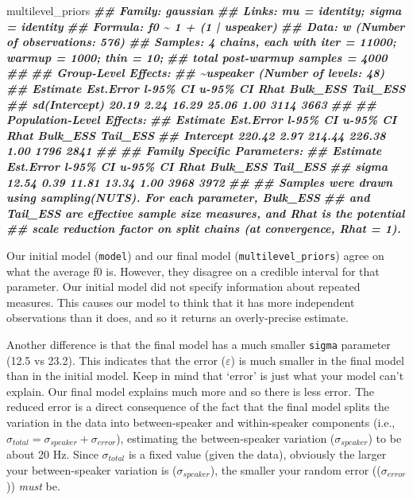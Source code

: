 \documentclass[
]{book}
\newenvironment{Shaded}{\begin{snugshade}}{\end{snugshade}}
\newcommand{\DocumentationTok}[1]{\textcolor[rgb]{0.56,0.35,0.01}{\textbf{\textit{#1}}}}
\newcommand{\NormalTok}[1]{#1}
\begin{document}
\begin{Shaded}
\begin{Highlighting}[]
\NormalTok{multilevel\_priors}
\DocumentationTok{\#\#  Family: gaussian }
\DocumentationTok{\#\#   Links: mu = identity; sigma = identity }
\DocumentationTok{\#\# Formula: f0 \textasciitilde{} 1 + (1 | uspeaker) }
\DocumentationTok{\#\#    Data: w (Number of observations: 576) }
\DocumentationTok{\#\# Samples: 4 chains, each with iter = 11000; warmup = 1000; thin = 10;}
\DocumentationTok{\#\#          total post{-}warmup samples = 4000}
\DocumentationTok{\#\# }
\DocumentationTok{\#\# Group{-}Level Effects: }
\DocumentationTok{\#\# \textasciitilde{}uspeaker (Number of levels: 48) }
\DocumentationTok{\#\#               Estimate Est.Error l{-}95\% CI u{-}95\% CI Rhat Bulk\_ESS Tail\_ESS}
\DocumentationTok{\#\# sd(Intercept)    20.19      2.24    16.29    25.06 1.00     3114     3663}
\DocumentationTok{\#\# }
\DocumentationTok{\#\# Population{-}Level Effects: }
\DocumentationTok{\#\#           Estimate Est.Error l{-}95\% CI u{-}95\% CI Rhat Bulk\_ESS Tail\_ESS}
\DocumentationTok{\#\# Intercept   220.42      2.97   214.44   226.38 1.00     1796     2841}
\DocumentationTok{\#\# }
\DocumentationTok{\#\# Family Specific Parameters: }
\DocumentationTok{\#\#       Estimate Est.Error l{-}95\% CI u{-}95\% CI Rhat Bulk\_ESS Tail\_ESS}
\DocumentationTok{\#\# sigma    12.54      0.39    11.81    13.34 1.00     3968     3972}
\DocumentationTok{\#\# }
\DocumentationTok{\#\# Samples were drawn using sampling(NUTS). For each parameter, Bulk\_ESS}
\DocumentationTok{\#\# and Tail\_ESS are effective sample size measures, and Rhat is the potential}
\DocumentationTok{\#\# scale reduction factor on split chains (at convergence, Rhat = 1).}
\end{Highlighting}
\end{Shaded}

Our initial model (\texttt{model}) and our final model (\texttt{multilevel\_priors}) agree on what the average f0 is. However, they disagree on a credible interval for that parameter. Our initial model did not specify information about repeated measures. This causes our model to think that it has more independent observations than it does, and so it returns an overly-precise estimate.

Another difference is that the final model has a much smaller \texttt{sigma} parameter (12.5 vs 23.2). This indicates that the error (\(\varepsilon\)) is much smaller in the final model than in the initial model. Keep in mind that `error' is just what your model can't explain. Our final model explains much more and so there is less error. The reduced error is a direct consequence of the fact that the final model splits the variation in the data into between-speaker and within-speaker components (i.e., \(\sigma_{total}=\sigma_{speaker}+\sigma_{error}\)), estimating the between-speaker variation (\(\sigma_{speaker}\)) to be about 20 Hz. Since \(\sigma_{total}\) is a fixed value (given the data), obviously the larger your between-speaker variation is (\(\sigma_{speaker}\)), the smaller your random error ((\(\sigma_{error}\))) \emph{must} be.
\end{document}
